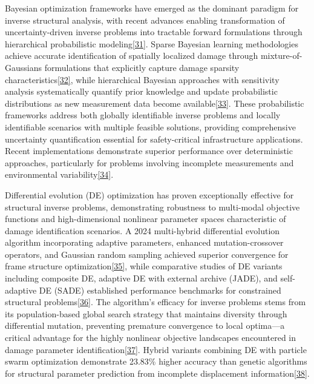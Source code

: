 \documentclass[12pt,a4paper]{report}
\begin{document}
Bayesian optimization frameworks have emerged as the dominant paradigm for inverse structural analysis, with recent advances enabling transformation of uncertainty-driven inverse problems into tractable forward formulations through hierarchical probabilistic modeling\href{https://www.researchgate.net/publication/380208708_Optimization_of_structural_damage_identification_method_based_on_finite_element_method_and_Bayesian_updating}{[31]}. Sparse Bayesian learning methodologies achieve accurate identification of spatially localized damage through mixture-of-Gaussians formulations that explicitly capture damage sparsity characteristics\href{https://www.sciencedirect.com/science/article/abs/pii/S0888327020300753}{[32]}, while hierarchical Bayesian approaches with sensitivity analysis systematically quantify prior knowledge and update probabilistic distributions as new measurement data become available\href{https://onlinelibrary.wiley.com/doi/10.1155/2024/4204316}{[33]}. These probabilistic frameworks address both globally identifiable inverse problems and locally identifiable scenarios with multiple feasible solutions, providing comprehensive uncertainty quantification essential for safety-critical infrastructure applications. Recent implementations demonstrate superior performance over deterministic approaches, particularly for problems involving incomplete measurements and environmental variability\href{https://link.springer.com/article/10.1007/s13349-025-00944-8}{[34]}.

Differential evolution (DE) optimization has proven exceptionally effective for structural inverse problems, demonstrating robustness to multi-modal objective functions and high-dimensional nonlinear parameter spaces characteristic of damage identification scenarios. A 2024 multi-hybrid differential evolution algorithm incorporating adaptive parameters, enhanced mutation-crossover operators, and Gaussian random sampling achieved superior convergence for frame structure optimization\href{https://www.nature.com/articles/s41598-024-54384-3}{[35]}, while comparative studies of DE variants including composite DE, adaptive DE with external archive (JADE), and self-adaptive DE (SADE) established performance benchmarks for constrained structural problems\href{https://www.frontiersin.org/journals/built-environment/articles/10.3389/fbuil.2020.00102/full}{[36]}. The algorithm's efficacy for inverse problems stems from its population-based global search strategy that maintains diversity through differential mutation, preventing premature convergence to local optima—a critical advantage for the highly nonlinear objective landscapes encountered in damage parameter identification\href{https://link.springer.com/chapter/10.1007/978-3-031-77432-4_9}{[37]}. Hybrid variants combining DE with particle swarm optimization demonstrate 23.83\% higher accuracy than genetic algorithms for structural parameter prediction from incomplete displacement information\href{https://link.springer.com/article/10.1007/s11709-024-1078-y}{[38]}.
\end{document}
